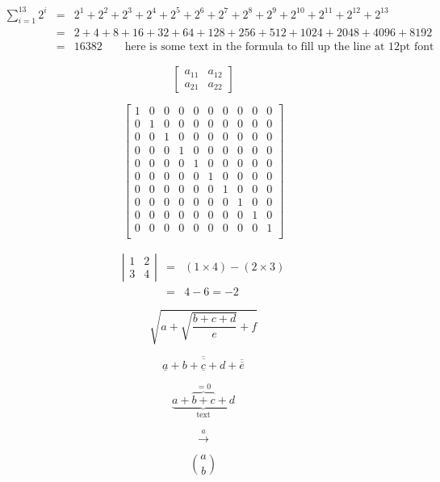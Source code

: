 \documentclass[12pt,a4paper]{article}
\begin{document}
\begin{eqnarray*}
\sum_{i=1}^{13} 2^i &=& 2^1 + 2^2 + 2^3 + 2^4 + 2^5 + 2^6 + 2^7 + 2^8 + 2^9 + 2^{10} + 2^{11} + 2^{12} + 2^{13}\\
&=&2 + 4 + 8 + 16 + 32 + 64 + 128 + 256 + 512 + 1024 + 2048 + 4096 + 8192\\
&=&16382 \qquad\mbox{here is some text in the formula to fill up the line at 12pt font}
\end{eqnarray*}

\[
\left[\begin{array}{cc} a_{11} & a_{12}\\ a_{21} & a_{22}\end{array}\right]
\]

\[
\left[\begin{array}{*{10}{c}} 
1 & 0 & 0 & 0 & 0 & 0 & 0 & 0 & 0 & 0 \\
0 & 1 & 0 & 0 & 0 & 0 & 0 & 0 & 0 & 0 \\
0 & 0 & 1 & 0 & 0 & 0 & 0 & 0 & 0 & 0 \\
0 & 0 & 0 & 1 & 0 & 0 & 0 & 0 & 0 & 0 \\ 
0 & 0 & 0 & 0 & 1 & 0 & 0 & 0 & 0 & 0 \\ 
0 & 0 & 0 & 0 & 0 & 1 & 0 & 0 & 0 & 0 \\ 
0 & 0 & 0 & 0 & 0 & 0 & 1 & 0 & 0 & 0 \\ 
0 & 0 & 0 & 0 & 0 & 0 & 0 & 1 & 0 & 0 \\ 
0 & 0 & 0 & 0 & 0 & 0 & 0 & 0 & 1 & 0 \\ 
0 & 0 & 0 & 0 & 0 & 0 & 0 & 0 & 0 & 1 \\ 
\end{array}\right]
\]

\begin{eqnarray*}
\left|\begin{array}{cc} 1 & 2\\ 3 & 4\end{array}\right| &=& (1\times 4) - (2 \times 3)\\
&=& 4-6 = -2
\end{eqnarray*}

\[
\sqrt{a + \sqrt{\frac{b + c + d}{e}} + f}
\]

\[
\overline{\underline{a} + \overline{b + \underline{c} + d} + \overline{\overline{e}}}
\]

\[
\underbrace{a + \overbrace{b + c}^{=0} + d}_{\mbox{text}}
\]

\[
\stackrel{a}{\longrightarrow}
\]

\[
{a \choose b}
\]
\end{document}

